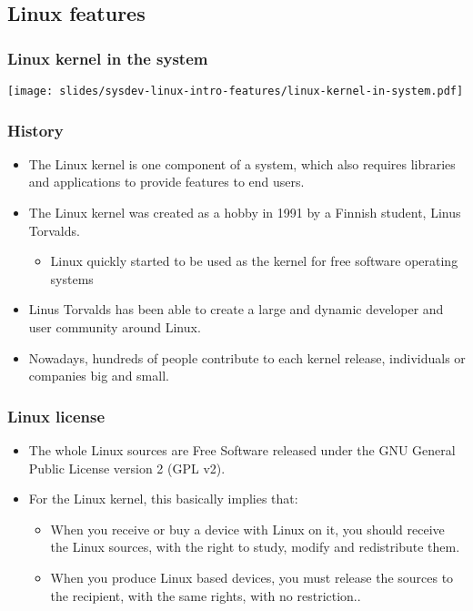 \subsection{Linux features}

\begin{frame}
  \frametitle{Linux kernel in the system}
  \begin{center}
    \texttt{[image: slides/sysdev-linux-intro-features/linux-kernel-in-system.pdf]}
  \end{center}
\end{frame}

\begin{frame}
  \frametitle{History}
  \begin{itemize}
  \item The Linux kernel is one component of a system, which also
    requires libraries and applications to provide features to end
    users.
  \item The Linux kernel was created as a hobby in 1991 by a Finnish
    student, Linus Torvalds.
    \begin{itemize}
    \item Linux quickly started to be used as the kernel for free
      software operating systems
    \end{itemize}
  \item Linus Torvalds has been able to create a large and dynamic
    developer and user community around Linux.
  \item Nowadays, hundreds of people contribute to each kernel
    release, individuals or companies big and small.
  \end{itemize}
\end{frame}

\begin{frame}
  \frametitle{Linux license}
  \begin{itemize}
  \item The whole Linux sources are Free Software released under the
    GNU General Public License version 2 (GPL v2).
  \item For the Linux kernel, this basically implies that:
    \begin{itemize}
    \item When you receive or buy a device with Linux on it, you
      should receive the Linux sources, with the right to study,
      modify and redistribute them.
    \item When you produce Linux based devices, you must release the
      sources to the recipient, with the same rights, with no
      restriction..
    \end{itemize}
  \end{itemize}
\end{frame}


